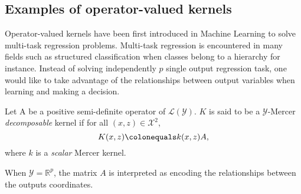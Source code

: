 \subsection{Examples of operator-valued kernels}
\label{subsec:ovk-ex}
Operator-valued kernels have been first introduced in Machine Learning to solve multi-task regression problems. Multi-task regression is encountered in many fields such as structured classification when classes belong to a hierarchy for instance. Instead of solving independently $p$ single output regression task, one would like to take advantage of the relationships between output variables when learning and making a decision.  
\begin{definition}
\label{dec-kernel}
Let A be a positive semi-definite operator of $\mathcal{L}(\mathcal{Y})$. $K$ is said to be a $\mathcal{Y}$-Mercer \emph{decomposable} kernel if for all $(x,z) \in \mathcal{X}^2$, 
\begin{dmath*}
K(x,z) \colonequals k(x,z)A, 
\end{dmath*}
where $k$ is a \emph{scalar} Mercer kernel.
\end{definition}
When $\mathcal{Y}=\mathbb{R}^p$, the matrix $A$ is interpreted as encoding the relationships between the outputs coordinates. 
